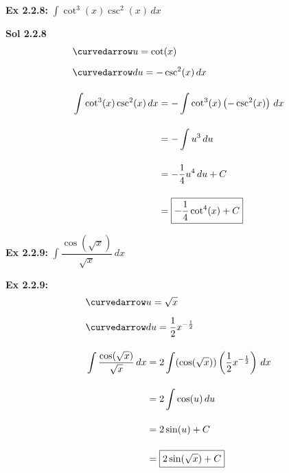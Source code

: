\begin{tcolorbox}[example]
    \textbf{Ex 2.2.8: } $\int \cot^3 (x)\csc^2 (x) \, dx$ 
\end{tcolorbox}
\begin{tcolorbox}[solution]
    \textbf{Sol 2.2.8 } \begin{align*}
        & \curvedarrow u = \cot (x) \\[5.5pt]
        & \curvedarrow du = -\csc^2 (x) \, dx \\[11pt]
        & \int \cot^3 (x)\csc^2 (x) \, dx \begin{aligned}[t]
            & = -\int \cot^3 (x)\left(-\csc^2 (x)\right) \, dx \\[11pt]
            & = -\int u^3 \, du \\[11pt]
            & = -\dfrac{1}{4}u^4 \, du + C \\[11pt]
            & = \boxed{-\dfrac{1}{4}\cot^4 (x) + C}
        \end{aligned}
    \end{align*}
\end{tcolorbox} \vspace{11pt}

\begin{tcolorbox}[example]
    \textbf{Ex 2.2.9: } $\int \dfrac{\cos (\sqrt{x})}{\sqrt{x}} \, dx$
\end{tcolorbox}
\begin{tcolorbox}[solution]
    \textbf{Ex 2.2.9: } \begin{align*}
        & \curvedarrow u = \sqrt{x} \\[5.5pt]
        & \curvedarrow du = \dfrac{1}{2}x^{-\frac{1}{2}} \\[11pt]
        & \int \dfrac{\cos (\sqrt{x})}{\sqrt{x}} \, dx \begin{aligned}[t]
            & = 2\int (\cos (\sqrt{x}))\left(\dfrac{1}{2}x^{-\frac{1}{2}}\right) \, dx \\[11pt]
            & = 2\int \cos (u) \, du \\[11pt]
            & = 2\sin (u) + C \\[11pt]
            & = \boxed{2\sin (\sqrt{x}) + C}
        \end{aligned}
    \end{align*}
\end{tcolorbox} \vspace{11pt}

